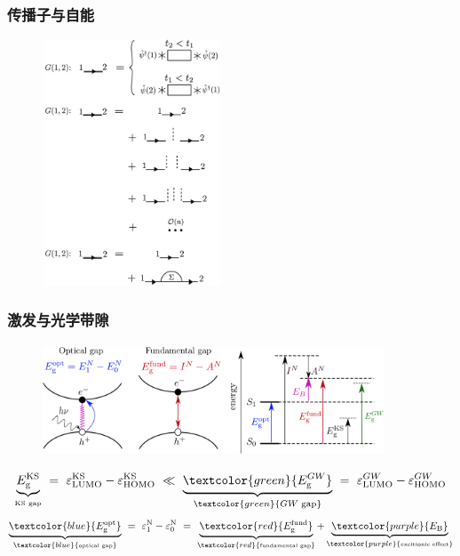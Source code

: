 \frame
{
	\frametitle{传播子与自能}
\begin{figure}[h!]
	\vspace{-0.13in}
\centering
\includegraphics[height=2.88in,width=2.10in,viewport=0 0 510 715,clip]{Figures/DFT_GW-4.jpg}
\label{Green's_function-physical-interaction}
\end{figure}
}

\frame
{
	\frametitle{激发与光学带隙}
\begin{figure}[h!]
\centering
\vspace{-10pt}
\includegraphics[height=1.3in,width=4.00in,viewport=0 0 1470 470,clip]{Figures/Green_function-Gap.png}
\label{GW-Optical_Gap}
\end{figure}
\begin{displaymath}
		\underbrace{E_{\textrm{g}}^{\mathrm{KS}}}_{\textrm{\tiny KS~gap}}~=~\varepsilon_{\mathrm{LUMO}}^{\mathrm{KS}}-\varepsilon_{\mathrm{HOMO}}^{\mathrm{KS}}~\ll~\underbrace{\textcolor{green}{E_{\mathrm{g}}^{GW}}}_{\textcolor{green}{\tiny GW~\textrm{gap}}} ~=~\varepsilon_{\mathrm{LUMO}}^{GW}-\varepsilon_{\mathrm{HOMO}}^{GW}
\end{displaymath}
\begin{displaymath}
		\underbrace{\textcolor{blue}{E_{\textrm{g}}^{\mathrm{opt}}}}_{\textcolor{blue}{\textrm{\tiny optical~gap}}}~=~\varepsilon_1^{\mathrm{N}}-\varepsilon_0^{\mathrm{N}}~=~\underbrace{\textcolor{red}{E_{\mathrm{g}}^{\mathrm{fund}}}}_{\textcolor{red}{\textrm{\tiny fundamental~gap}}}+\underbrace{\textcolor{purple}{E_{\mathrm{B}}}}_{\textcolor{purple}{\textrm{\tiny excitionic effect}}}
\end{displaymath}
}

